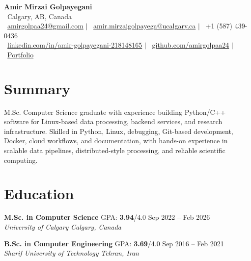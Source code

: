 \documentclass[a4paper,10pt]{article}
\newcommand{\resumeEducationSubheading}[5]{
    \textbf{#1} \hfill #2 \hfill #3 \\
    \textit{#4} \hfill \textit{#5}
}
\begin{document}

\begin{center}
    {\LARGE \textbf{Amir Mirzai Golpayegani}} \\[0.25em]
    \faMapMarker*~Calgary, AB, Canada \\[0.25em]
    \faEnvelope~\href{mailto:amirgolpaa24@gmail.com}{amirgolpaa24@gmail.com}
    $|$
    \faEnvelope~\href{mailto:amir.mirzaigolpayega@ucalgary.ca}{amir.mirzaigolpayega@ucalgary.ca}
    $|$
    \faPhone*~+1 (587) 439-0436 \\[0.25em]
    \faLinkedin~\href{https://linkedin.com/in/amir-golpayegani-218148165}{linkedin.com/in/amir-golpayegani-218148165}
    $|$
    \faGithub~\href{https://github.com/amirgolpaa24}{github.com/amirgolpaa24}
    $|$
    \faGlobe~\href{https://amir-portfolio-navy.vercel.app/}{Portfolio}
\end{center}


\section*{Summary}

M.Sc. Computer Science graduate with experience building Python/C++ software for Linux-based data processing, backend services, and research infrastructure. Skilled in Python, Linux, debugging, Git-based development, Docker, cloud workflows, and documentation, with hands-on experience in scalable data pipelines, distributed-style processing, and reliable scientific computing.


\section*{Education}

\resumeEducationSubheading
{M.Sc. in Computer Science}
{GPA: \textbf{3.94}/4.0}
{Sep 2022 -- Feb 2026}
{University of Calgary}
{Calgary, Canada}

\vspace{0.35em}

\resumeEducationSubheading
{B.Sc. in Computer Engineering}
{GPA: \textbf{3.69}/4.0}
{Sep 2016 -- Feb 2021}
{Sharif University of Technology}
{Tehran, Iran}

\end{document}
